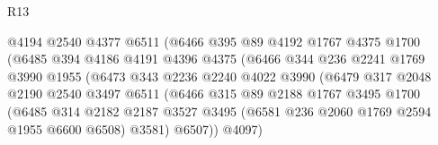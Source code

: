 \begin{lexlean}{R13}
\begin{coremodule}
                                  @4194
                                  @2540
                                  @4377
                                  @6511
                                  (@6466
                                    @395
                                    @89
                                    @4192
                                    @1767
                                    @4375
                                    @1700
                                    (@6485
                                      @394
                                      @4186
                                      @4191
                                      @4396
                                      @4375
                                      (@6466
                                        @344
                                        @236
                                        @2241
                                        @1769
                                        @3990
                                        @1955
                                        (@6473
                                          @343
                                          @2236
                                          @2240
                                          @4022
                                          @3990
                                          (@6479
                                            @317
                                            @2048
                                            @2190
                                            @2540
                                            @3497
                                            @6511
                                            (@6466
                                              @315
                                              @89
                                              @2188
                                              @1767
                                              @3495
                                              @1700
                                              (@6485
                                                @314
                                                @2182
                                                @2187
                                                @3527
                                                @3495
                                                (@6581 @236 @2060 @1769 @2594 @1955 @6600 @6508)
                                                @3581)
                                              @6507))
                                          @4097)

\end{coremodule}
\end{lexlean}
